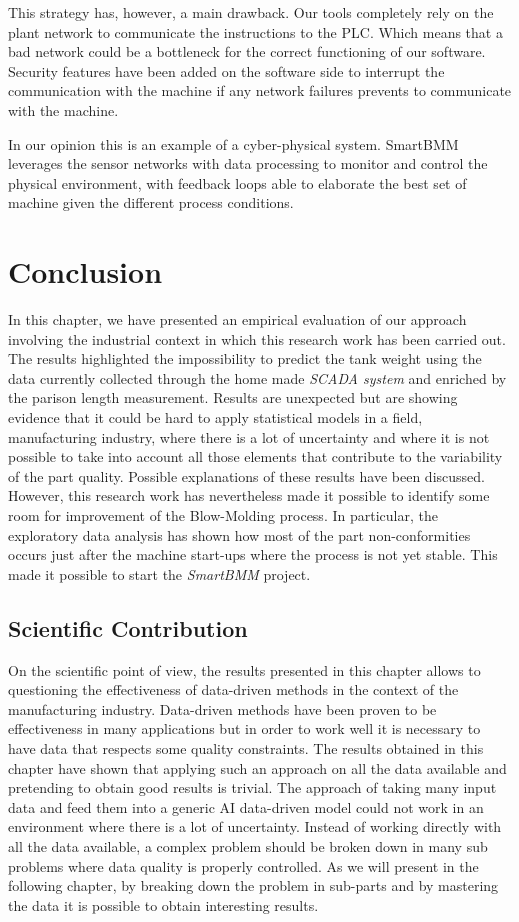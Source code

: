 %
This strategy has, however, a main drawback. Our tools completely rely on the plant network to communicate the instructions to the PLC. Which means that a bad network could be a bottleneck for the correct functioning of our software. Security features have been added on the software side to interrupt the communication with the machine if any network failures prevents to communicate with the machine.

In our opinion this is an example of a cyber-physical system. SmartBMM leverages the sensor networks with data processing to monitor and control the physical environment, with feedback loops able to elaborate the best set of machine given the different process conditions.


\section{Conclusion}

In this chapter, we have presented an empirical evaluation of our approach involving the industrial context in which this research work has been carried out. The results highlighted the impossibility to predict the tank weight using the data currently collected through the home made \textit{SCADA system} and enriched by the parison length measurement. Results are unexpected but are showing evidence that it could be hard to apply statistical models in a field, manufacturing industry, where there is a lot of uncertainty and where it is not possible to take into account all those elements that contribute to the variability of the part quality. Possible explanations of these results have been discussed. However, this research work has nevertheless made it possible to identify some room for improvement of the Blow-Molding process. In particular, the exploratory data analysis has shown how most of the part non-conformities occurs just after the machine start-ups where the process is not yet stable. This made it possible to start the \textit{SmartBMM} project.  


\subsection{Scientific Contribution}

On the scientific point of view, the results presented in this chapter allows to questioning the effectiveness of data-driven methods in the context of the manufacturing industry. Data-driven methods have been proven to be effectiveness in many applications but in order to work well it is necessary to have data that respects some quality constraints. The results obtained in this chapter have shown that applying such an approach on all the data available and pretending to obtain good results is trivial. The approach of taking many input data and feed them into a generic AI data-driven model could not work in an environment where there is a lot of uncertainty. Instead of working directly with all the data available, a complex problem should be broken down in many sub problems where data quality is properly controlled. As we will present in the following chapter, by breaking down the problem in sub-parts and by mastering the data it is possible to obtain interesting results. 

